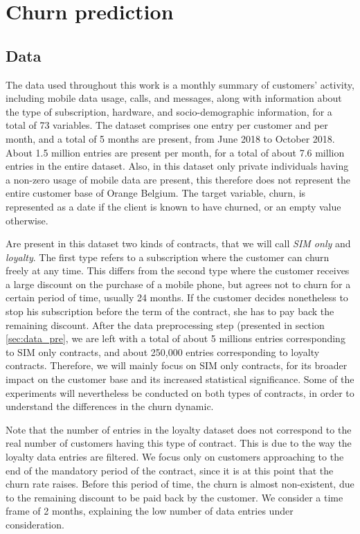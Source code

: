 \chapter{Churn prediction}
\label{ch:churn}

\section{Data}
\label{sec:churn_data}

The data used throughout this work is a monthly summary of customers' activity,
including mobile data usage, calls, and messages, along with information about
the type of subscription, hardware, and socio-demographic information, for a
total of 73 variables. The dataset comprises one entry per customer and per
month, and a total of 5 months are present, from June 2018 to October 2018.
About 1.5 million entries are present per month, for a total of about 7.6
million entries in the entire dataset. Also, in this dataset only private
individuals having a non-zero usage of mobile data are present, this therefore
does not represent the entire customer base of Orange Belgium. The target
variable, churn, is represented as a date if the client is known to have
churned, or an empty value otherwise.

Are present in this dataset two kinds of contracts, that we will call \emph{SIM
only} and \emph{loyalty}. The first type refers to a subscription where the
customer can churn freely at any time. This differs from the second type where
the customer receives a large discount on the purchase of a mobile phone, but
agrees not to churn for a certain period of time, usually 24 months. If the
customer decides nonetheless to stop his subscription before the term of the
contract, she has to pay back the remaining discount. After the data
preprocessing step (presented in section \ref{sec:data_pre}, we are left with a
total of about 5 millions entries corresponding to SIM only contracts, and about
250,000 entries corresponding to loyalty contracts. Therefore, we will mainly
focus on SIM only contracts, for its broader impact on the customer base and its
increased statistical significance. Some of the experiments will nevertheless be
conducted on both types of contracts, in order to understand the differences in
the churn dynamic.

Note that the number of entries in the loyalty dataset does not correspond to
the real number of customers having this type of contract. This is due to the
way the loyalty data entries are filtered. We focus only on customers
approaching to the end of the mandatory period of the contract, since it is at
this point that the churn rate raises. Before this period of time, the churn is
almost non-existent, due to the remaining discount to be paid back by the
customer. We consider a time frame of 2 months, explaining the low number of
data entries under consideration.

